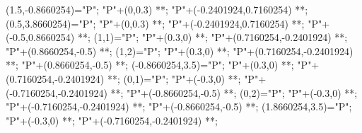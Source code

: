 {         (1.5,-0.8660254)="P"; "P"+(0,0.3) **\dir{-}; 
                "P"+(-0.2401924,0.7160254) **\dir{-};
         (0.5,3.8660254)="P"; "P"+(0,0.3) **\dir{-}; 
                "P"+(-0.2401924,0.7160254) **\dir{-};
                "P"+(-0.5,0.8660254) **\dir{-};
         (1,1)="P"; "P"+(0.3,0) **\dir{-}; "P"+(0.7160254,-0.2401924) **\dir{-};
               "P"+(0.8660254,-0.5) **\dir{-};
         (1,2)="P"; "P"+(0.3,0) **\dir{-}; "P"+(0.7160254,-0.2401924) **\dir{-};
               "P"+(0.8660254,-0.5) **\dir{-};
         (-0.8660254,3.5)="P"; "P"+(0.3,0) **\dir{-}; 
               "P"+(0.7160254,-0.2401924) **\dir{-};
         (0,1)="P"; "P"+(-0.3,0) **\dir{-}; "P"+(-0.7160254,-0.2401924) **\dir{-};
               "P"+(-0.8660254,-0.5) **\dir{-};
         (0,2)="P"; "P"+(-0.3,0) **\dir{-}; "P"+(-0.7160254,-0.2401924) **\dir{-};
               "P"+(-0.8660254,-0.5) **\dir{-};
         (1.8660254,3.5)="P"; "P"+(-0.3,0) **\dir{-}; 
               "P"+(-0.7160254,-0.2401924) **\dir{-};
\endxy}

